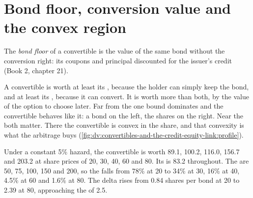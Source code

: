 \section{Bond floor, conversion value and the convex region}

\begin{definition}\label{def:dv:convertibles-and-the-credit-equity-link:floor}
The \emph{bond floor} of a convertible is the value of the same bond without the conversion right: its coupons and
principal discounted for the issuer's credit (Book 2, chapter 21).
\end{definition}

A convertible is worth at least its , because the holder can simply keep the bond, and at least its ,
because it can convert. It is worth more than both, by the value of the option to choose later. Far from the  one
bound dominates and the convertible behaves like it: a bond on the left, the shares on the right. Near the  both
matter. There the convertible is convex in the share, and that convexity is what the arbitrage buys
(\cref{fig:dv:convertibles-and-the-credit-equity-link:profile}).

\begin{example}\label{ex:dv:convertibles-and-the-credit-equity-link:profile}
Under a constant 5\% hazard, the convertible is worth 89.1, 100.2, 116.0, 156.7 and 203.2 at share prices of 20, 30, 40, 60 and 80. Its  is 83.2 throughout. The  are 50, 75, 100, 150 and 200, so the  falls from 78\% at 20 to 34\% at 30,
16\% at 40, 4.5\% at 60 and 1.6\% at 80. The delta rises from 0.84 shares per bond at 20 to 2.39 at 80, approaching the  of 2.5.
\end{example}

